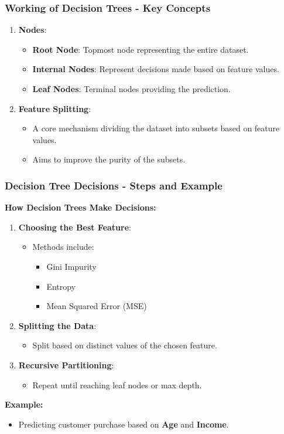 \documentclass[aspectratio=169]{beamer}
\begin{document}
\begin{frame}[fragile]
  \frametitle{Working of Decision Trees - Key Concepts}
  \begin{enumerate}
    \item \textbf{Nodes}:
    \begin{itemize}
      \item \textbf{Root Node}: Topmost node representing the entire dataset.
      \item \textbf{Internal Nodes}: Represent decisions made based on feature values.
      \item \textbf{Leaf Nodes}: Terminal nodes providing the prediction.
    \end{itemize}
    
    \item \textbf{Feature Splitting}:
    \begin{itemize}
      \item A core mechanism dividing the dataset into subsets based on feature values.
      \item Aims to improve the purity of the subsets.
    \end{itemize}
  \end{enumerate}
\end{frame}

\begin{frame}[fragile]
  \frametitle{Decision Tree Decisions - Steps and Example}
  \textbf{How Decision Trees Make Decisions:}
  \begin{enumerate}
    \item \textbf{Choosing the Best Feature}:
    \begin{itemize}
      \item Methods include:
      \begin{itemize}
        \item Gini Impurity
        \item Entropy
        \item Mean Squared Error (MSE)
      \end{itemize}
    \end{itemize}
  
    \item \textbf{Splitting the Data}:
    \begin{itemize}
      \item Split based on distinct values of the chosen feature.
    \end{itemize}
  
    \item \textbf{Recursive Partitioning}:
    \begin{itemize}
      \item Repeat until reaching leaf nodes or max depth.
    \end{itemize}
  \end{enumerate}

  \textbf{Example:}
  \begin{itemize}
    \item Predicting customer purchase based on \textbf{Age} and \textbf{Income}.
  \end{itemize}
\end{frame}
\end{document}
